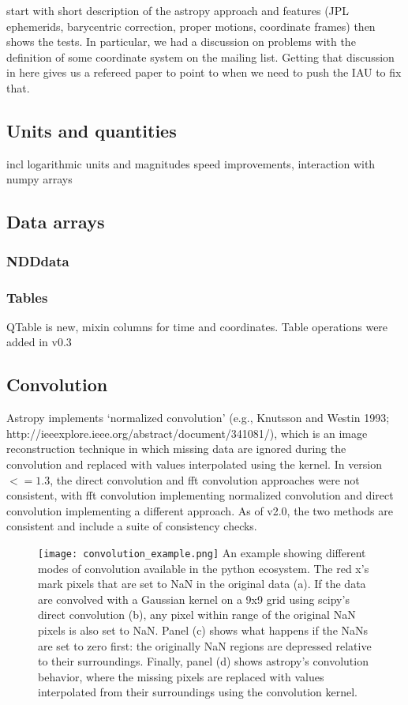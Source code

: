 \documentclass[modern]{aastex61}
\begin{document}
start with short description of the astropy approach and features (JPL ephemerids, barycentric correction, proper motions, coordinate frames) then shows the tests. In particular, we had a discussion on problems with the definition of some coordinate system on the mailing list. Getting that discussion in here gives us a refereed paper to point to when we need to push the IAU to fix that.

\subsection{Units and quantities}

incl logarithmic units and magnitudes
speed improvements,
interaction with numpy arrays

\subsection{Data arrays}

\subsubsection{NDDdata}

\subsubsection{Tables}
QTable is new, mixin columns for time and coordinates. Table operations were added in v0.3

\subsection{Convolution}
Astropy implements `normalized convolution' (e.g., Knutsson and Westin 1993; http://ieeexplore.ieee.org/abstract/document/341081/), which is an image reconstruction technique in which missing data are ignored during the convolution and replaced with values interpolated using the kernel.   In version $<=1.3$, the direct convolution and fft convolution approaches were not consistent, with fft convolution implementing normalized convolution and direct convolution implementing a different approach.  As of v2.0, the two methods are consistent and include a suite of consistency checks.


\begin{figure}
\texttt{[image: convolution\_example.png]}
An example showing different modes of convolution available in the python ecosystem.  The red x's mark pixels that are set to NaN in the original data (a).  If the data are convolved with a Gaussian kernel on a 9x9 grid using scipy's direct convolution (b), any pixel within range of the original NaN pixels is also set to NaN.  Panel (c) shows what happens if the NaNs are set to zero first: the originally NaN regions are depressed relative to their surroundings.  Finally, panel (d) shows astropy's convolution behavior, where the missing pixels are replaced with values interpolated from their surroundings using the convolution kernel.
\end{figure}
\end{document}
